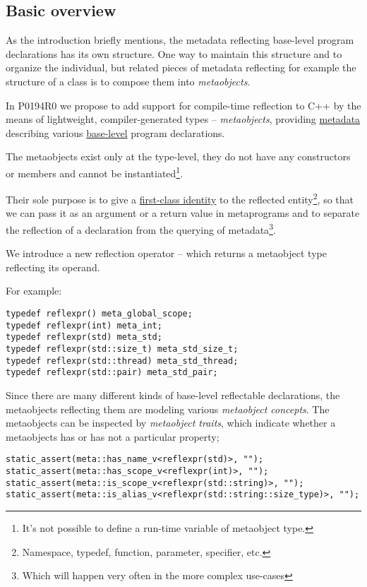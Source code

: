 \subsection{Basic overview}

As the introduction briefly mentions, the metadata reflecting base-level
program declarations has its own structure. One way to maintain this structure
and to organize the individual, but related pieces of metadata reflecting
for example the structure of a class is to compose them into {\em metaobjects}.

In P0194R0 we propose to add support for
compile-time reflection to C++ by the means of lightweight, compiler-generated
types -- {\em metaobjects}, providing \hyperref[term-metadata]{metadata}
describing various \hyperref[term-base-meta-level]{base-level} program declarations.

The metaobjects exist only at the type-level, they do not have any constructors
or members and cannot be instantiated\footnote{It's not possible to define
a run-time variable of metaobject type.}.

Their sole purpose is to give a \hyperref[term-first-class]{first-class identity}
to the reflected entity\footnote{Namespace, typedef, function, parameter, specifier, etc.},
so that we can pass it as an argument or a return value in metaprograms and to
separate the reflection of a declaration from the querying of metadata\footnote
{Which will happen very often in the more complex use-cases}.

We introduce a new reflection operator -- \verb@reflexpr@ which returns a
metaobject type reflecting its operand.

For example:

\begin{verbatim}
typedef reflexpr() meta_global_scope;
typedef reflexpr(int) meta_int;
typedef reflexpr(std) meta_std;
typedef reflexpr(std::size_t) meta_std_size_t;
typedef reflexpr(std::thread) meta_std_thread;
typedef reflexpr(std::pair) meta_std_pair;
\end{verbatim}

Since there are many different kinds of
base-level reflectable declarations, the metaobjects reflecting them are
modeling various {\em metaobject concepts}. The metaobjects can be inspected
by {\em metaobject traits}, which indicate whether a metaobjects has or has
not a particular property;

\begin{verbatim}
static_assert(meta::has_name_v<reflexpr(std)>, "");
static_assert(meta::has_scope_v<reflexpr(int)>, "");
static_assert(meta::is_scope_v<reflexpr(std::string)>, "");
static_assert(meta::is_alias_v<reflexpr(std::string::size_type)>, "");
\end{verbatim}

